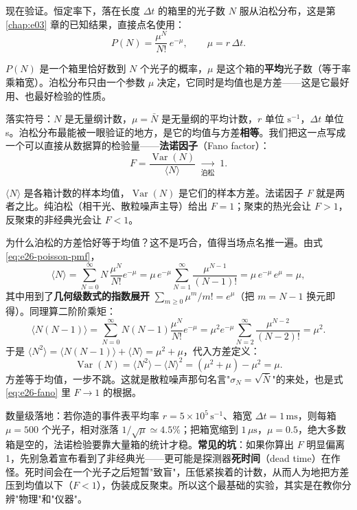 现在验证。恒定率下，落在长度 \(\Delta t\) 的箱里的光子数 \(N\) 服从泊松分布，这是第 \ref{chap:e03} 章的已知结果，直接点名使用：
\begin{equation}
  P(N)=\frac{\mu^{N}}{N!}\,e^{-\mu},\qquad \mu=r\,\Delta t .
  \label{eq:e26-poisson-pmf}
\end{equation}
\begin{formulaexplain}
\(P(N)\) 是一个箱里恰好数到 \(N\) 个光子的概率，\(\mu\) 是这个箱的\textbf{平均}光子数（等于率乘箱宽）。泊松分布只由一个参数 \(\mu\) 决定，它同时是均值也是方差——这是它最好用、也最好检验的性质。
\end{formulaexplain}
落实符号：\(N\) 是无量纲计数，\(\mu=\bar N\) 是无量纲的平均计数，\(r\) 单位 \(\mathrm{s^{-1}}\)，\(\Delta t\) 单位 s。泊松分布最能被一眼验证的地方，是它的均值与方差\textbf{相等}。我们把这一点写成一个可以直接从数据算的检验量——\textbf{法诺因子}（Fano factor）：
\begin{equation}
  F=\frac{\operatorname{Var}(N)}{\langle N\rangle}\;\xrightarrow[\text{泊松}]{}\;1 .
  \label{eq:e26-fano}
\end{equation}
\begin{formulaexplain}
\(\langle N\rangle\) 是各箱计数的样本均值，\(\operatorname{Var}(N)\) 是它们的样本方差。法诺因子 \(F\) 就是两者之比。纯泊松（相干光、散粒噪声主导）给出 \(F=1\)；聚束的热光会让 \(F>1\)，反聚束的非经典光会让 \(F<1\)。
\end{formulaexplain}
为什么泊松的方差恰好等于均值？这不是巧合，值得当场点名推一遍。由式 \eqref{eq:e26-poisson-pmf}，
\[
  \langle N\rangle=\sum_{N=0}^{\infty}N\,\frac{\mu^N}{N!}e^{-\mu}
  =\mu\,e^{-\mu}\sum_{N=1}^{\infty}\frac{\mu^{N-1}}{(N-1)!}
  =\mu\,e^{-\mu}\,e^{\mu}=\mu,
\]
其中用到了\textbf{几何级数式的指数展开} \(\sum_{m\ge0}\mu^m/m!=e^{\mu}\)（把 \(m=N-1\) 换元即得）。同理算二阶阶乘矩：
\[
  \langle N(N-1)\rangle=\sum_{N=0}^{\infty}N(N-1)\frac{\mu^N}{N!}e^{-\mu}
  =\mu^2 e^{-\mu}\sum_{N=2}^{\infty}\frac{\mu^{N-2}}{(N-2)!}=\mu^2 .
\]
于是 \(\langle N^2\rangle=\langle N(N-1)\rangle+\langle N\rangle=\mu^2+\mu\)，代入方差定义：
\[
  \operatorname{Var}(N)=\langle N^2\rangle-\langle N\rangle^2=(\mu^2+\mu)-\mu^2=\mu .
\]
方差等于均值，一步不跳。这就是散粒噪声那句名言"\(\sigma_N=\sqrt{\bar N}\)"的来处，也是式 \eqref{eq:e26-fano} 里 \(F\to1\) 的根据。

数量级落地：若你造的事件表平均率 \(r=5\times10^{5}\,\mathrm{s^{-1}}\)、箱宽 \(\Delta t=1\,\mathrm{ms}\)，则每箱 \(\mu=500\) 个光子，相对涨落 \(1/\sqrt{\mu}\simeq4.5\%\)；把箱宽缩到 \(1\,\mu\mathrm{s}\)，\(\mu=0.5\)，绝大多数箱是空的，法诺检验要靠大量箱的统计才稳。\textbf{常见的坑}：如果你算出 \(F\) 明显偏离 1，先别急着宣布看到了非经典光——更可能是探测器\textbf{死时间}（dead time）在作怪。死时间会在一个光子之后短暂"致盲"，压低紧挨着的计数，从而人为地把方差压到均值以下（\(F<1\)），伪装成反聚束。所以这个最基础的实验，其实是在教你分辨"物理"和"仪器"。

